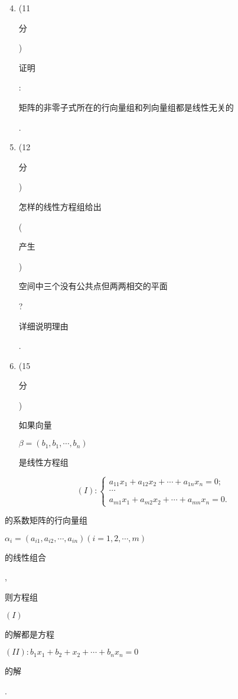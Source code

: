\documentclass[10pt]{article}
\begin{document}
\begin{enumerate}
  \setcounter{enumi}{3}
  \item (11 \begin{CJK}{UTF8}{mj}分\end{CJK}) \begin{CJK}{UTF8}{mj}证明\end{CJK}: \begin{CJK}{UTF8}{mj}矩阵的非零子式所在的行向量组和列向量组都是线性无关的\end{CJK}.

  \item (12 \begin{CJK}{UTF8}{mj}分\end{CJK}) \begin{CJK}{UTF8}{mj}怎样的线性方程组给出\end{CJK} (\begin{CJK}{UTF8}{mj}产生\end{CJK})\begin{CJK}{UTF8}{mj}空间中三个没有公共点但两两相交的平面\end{CJK}? \begin{CJK}{UTF8}{mj}详细说明理由\end{CJK}.

  \item (15 \begin{CJK}{UTF8}{mj}分\end{CJK}) \begin{CJK}{UTF8}{mj}如果向量\end{CJK} $\beta=\left(b_{1}, b_{1}, \cdots, b_{n}\right)$ \begin{CJK}{UTF8}{mj}是线性方程组\end{CJK}

\end{enumerate}
$$
(I):\left\{\begin{array}{c}
a_{11} x_{1}+a_{12} x_{2}+\cdots+a_{1 n} x_{n}=0 ; \\
\cdots \\
a_{m 1} x_{1}+a_{m 2} x_{2}+\cdots+a_{m n} x_{n}=0 .
\end{array}\right.
$$
\begin{CJK}{UTF8}{mj}的系数矩阵的行向量组\end{CJK} $\alpha_{i}=\left(a_{i 1}, a_{i 2}, \cdots, a_{i n}\right)(i=1,2, \cdots, m)$ \begin{CJK}{UTF8}{mj}的线性组合\end{CJK}, \begin{CJK}{UTF8}{mj}则方程组\end{CJK} $(I)$ \begin{CJK}{UTF8}{mj}的解都是方程\end{CJK} $(I I): b_{1} x_{1}+b_{2}+x_{2}+\cdots+b_{n} x_{n}=0$ \begin{CJK}{UTF8}{mj}的解\end{CJK}.
\end{document}
